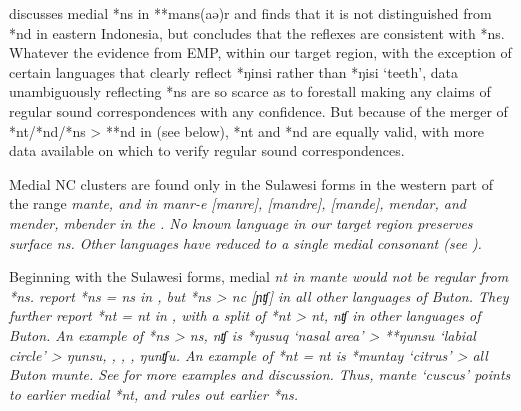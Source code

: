 \citet[242]{Blust1982} discusses medial *ns in **mans(aə)r
and finds that it is not distinguished from *nd in eastern Indonesia,
but concludes that the reflexes are consistent with *ns.
Whatever the evidence from EMP,
within our target region,
with the exception of certain  languages that
clearly reflect *ŋinsi rather than *ŋisi ‘teeth’,
data unambiguously reflecting *ns are so scarce as to forestall
making any claims of regular sound correspondences with any confidence.
But because of the merger of *nt/*nd/*ns > **nd in 
(see below), *nt and *nd are equally valid,
with more data available on which to verify regular sound correspondences.

Medial NC clusters are found only in the Sulawesi forms in the
western part of the range \it{mante},
and in  \it{manr-e} [manre],
[mandre], [mande],  \it{mendar}, and  \it{mender,
mbender} in the .
No known language in our target region preserves surface \it{ns}.
Other languages have reduced to a single medial consonant (see ).

Beginning with the Sulawesi forms,
medial \it{nt} in \it{mante} would not be regular from *ns.
\citet[38--40]{MeadTruong2021} report *ns = \it{ns} in ,
but *ns > \it{nc} [ɲʧ] in all other languages of Buton.
They further report *nt = \it{nt} in ,
with a split of *nt > \it{nt,
nʧ} in other languages of Buton.
An example of *ns > \it{ns,
nʧ} is *ŋusuq ‘nasal area’ > **ŋunsu ‘labial circle’ > 
\it{ŋunsu}, , , ,  \it{ŋunʧu}.
An example of *nt = \it{nt} is *muntay ‘citrus’ > all Buton \it{munte}.
See \citet[38--40]{MeadTruong2021} for more examples and discussion.
Thus,  \it{mante} ‘cuscus’ points to earlier
medial *nt, and rules out earlier *ns.

